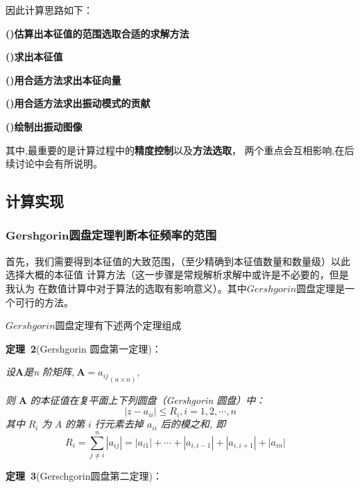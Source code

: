 \documentclass[11pt, a4paper, oneside]{ctexart}
\begin{document}
{{因此计算思路如下：


{\hspace{8mm}\textbf{()估算出本征值的范围选取合适的求解方法}

\hspace{8mm}\textbf{()求出本征值}

\hspace{8mm}\textbf{()用合适方法求出本征向量}

\hspace{8mm}\textbf{()用合适方法求出振动模式的贡献}

\hspace{8mm}\textbf{()绘制出振动图像}}

其中,最重要的是计算过程中的\textbf{精度控制}以及\textbf{方法选取}，
两个重点会互相影响,在后续讨论中会有所说明。


}

\subsection{计算实现}
\subsubsection{$\mathbf {Gershgorin}$圆盘定理判断本征频率的范围}
{
    首先，我们需要得到本征值的大致范围，（至少精确到本征值数量和数量级）以此选择大概的本征值
    计算方法（这一步骤是常规解析求解中或许是不必要的，但是我认为
    在数值计算中对于算法的选取有影响意义）。其中$ {Gershgorin}$圆盘定理是一个可行的方法。
    
    $ {Gershgorin}${圆盘定理}有下述两个定理组成
    \vspace{2mm}

    \textbf{定理\ 2}(Gershgorin
    圆盘第一定理)：
    
    \emph{设}$\boldsymbol {A}$\emph{是n
    阶矩阵,}$\ \boldsymbol A={a_{ij}}_{(n \times n)},\ ${\emph 则
    $\boldsymbol A$   \emph{的本征值在复平面上下列圆盘（Gershgorin 圆盘）中：
    }
    $$
    \left|z-a_{i i}\right| \leq R_{i}, i=1,2, \cdots, n
    $$
    \emph{其中} $R_{i}$ \emph 为 $A$ \emph{的第{} $i$
    行元素去掉 $a_{i i}$ 后的模之和, 即
    $$R_{i}=\sum_{j \neq i}^{n}\left|a_{i j}\right|=\left|a_{i 1}\right|+\cdots+\left|a_{i, i-1}\right|+\left|a_{i, i+1}\right|+\left|a_{i n}\right| \quad$$ 
    }
    \vspace{-6mm}

    \textbf{定理\ 3}(Gerschgorin圆盘第二定理)：
    
}}}
\end{document}

